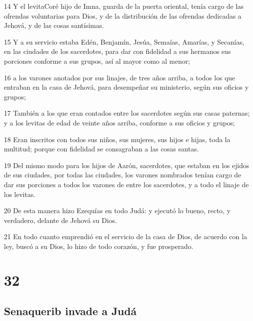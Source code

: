 \par 14 Y el levitaCoré hijo de Imna, guarda de la puerta oriental, tenía cargo de las ofrendas voluntarias para Dios, y de la distribución de las ofrendas dedicadas a Jehová, y de las cosas santísimas.
\par 15 Y a su servicio estaba Edén, Benjamín, Jesúa, Semaías, Amarías, y Secanías, en las ciudades de los sacerdotes, para dar con fidelidad a sus hermanos sus porciones conforme a sus grupos, así al mayor como al menor;
\par 16 a los varones anotados por sus linajes, de tres años arriba, a todos los que entraban en la casa de Jehová, para desempeñar su ministerio, según sus oficios y grupos;
\par 17 También a los que eran contados entre los sacerdotes según sus casas paternas; y a los levitas de edad de veinte años arriba, conforme a sus oficios y grupos;
\par 18 Eran inscritos con todos sus niños, sus mujeres, sus hijos e hijas, toda la multitud; porque con fidelidad se consagraban a las cosas santas.
\par 19 Del mismo modo para los hijos de Aarón, sacerdotes, que estaban en los ejidos de sus ciudades, por todas las ciudades, los varones nombrados tenían cargo de dar sus porciones a todos los varones de entre los sacerdotes, y a todo el linaje de los levitas.
\par 20 De esta manera hizo Ezequías en todo Judá: y ejecutó lo bueno, recto, y verdadero, delante de Jehová su Dios.
\par 21 En todo cuanto emprendió en el servicio de la casa de Dios, de acuerdo con la ley, buscó a su Dios, lo hizo de todo corazón, y fue prosperado.

\chapter{32}

\section*{Senaquerib invade a Judá }

